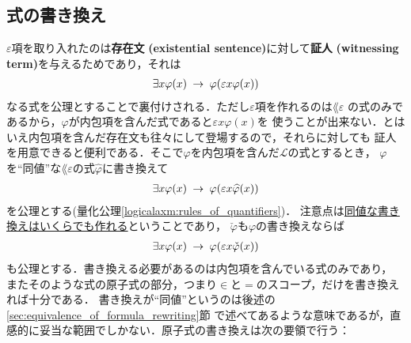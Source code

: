 \subsection{式の書き換え}
\label{subsec:formula_rewriting}
	$\varepsilon$項を取り入れたのは{\bf 存在文}
	{\bf (existential sentence)}に対して{\bf 証人}
	{\bf (witnessing term)}を与えるためであり，それは
	\begin{align}
		\exists x \varphi(x) \hspace{0.25em}\rightarrow\hspace{0.25em} \varphi(\varepsilon x \varphi(x))
	\end{align}
	なる式を公理とすることで裏付けされる．ただし$\varepsilon$項を作れるのは$\lang{\varepsilon}$
	の式のみであるから，$\varphi$が内包項を含んだ式であると$\varepsilon x \varphi(x)$を
	使うことが出来ない．とはいえ内包項を含んだ存在文も往々にして登場するので，それらに対しても
	証人を用意できると便利である．そこで$\varphi$を内包項を含んだ$\mathcal{L}$の式とするとき，
	$\varphi$を``同値''な$\lang{\varepsilon}$の式$\widehat{\varphi}$に書き換えて
	\begin{align}
		\exists x \varphi(x) \hspace{0.25em}\rightarrow\hspace{0.25em} \varphi(\varepsilon x \widehat{\varphi}(x))
	\end{align}
	を公理とする(量化公理\ref{logicalaxm:rules_of_quantifiers})．
	注意点は\underline{同値な書き換えはいくらでも作れる}ということであり，
	$\check{\varphi}$も$\varphi$の書き換えならば
	\begin{align}
		\exists x \varphi(x) \hspace{0.25em}\rightarrow\hspace{0.25em} \varphi(\varepsilon x \check{\varphi}(x))
	\end{align}
	も公理とする．書き換える必要があるのは内包項を含んでいる式のみであり，
	またそのような式の原子式の部分，つまり$\in$と$=$のスコープ，だけを書き換えれば十分である．
	書き換えが``同値''というのは後述の\ref{sec:equivalence_of_formula_rewriting}節
	で述べてあるような意味であるが，直感的に妥当な範囲でしかない．原子式の書き換えは次の要領で行う：
	
